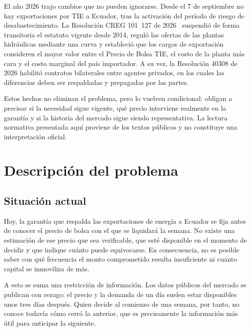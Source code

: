 \documentclass[11pt,letterpaper]{article}
\begin{document}
El año 2026 trajo cambios que no pueden ignorarse. Desde el 7 de
septiembre no hay exportaciones por TIE a Ecuador, tras la activación
del período de riesgo de desabastecimiento. La Resolución CREG 101~127
de 2026~\cite{creg2026} suspendió de forma transitoria el estatuto vigente desde 2014,
reguló las ofertas de las plantas hidráulicas mediante una curva y
estableció que los cargos de exportación consideren el mayor valor entre
el Precio de Bolsa TIE, el costo de la planta más cara y el costo
marginal del país importador. A su vez, la Resolución 40308 de 2026
habilitó contratos bilaterales entre agentes privados, en los cuales las
diferencias deben ser respaldadas y prepagadas por las partes.

Estos hechos no eliminan el problema, pero lo vuelven condicional:
obligan a precisar si la necesidad sigue vigente, qué precio interviene
realmente en la garantía y si la historia del mercado sigue siendo
representativa. La lectura normativa presentada aquí proviene de los
textos públicos y no constituye una interpretación oficial.

\section{Descripción del problema}
\label{sec:problema}

\subsection{Situación actual}

Hoy, la garantía que respalda las exportaciones de energía a Ecuador se
fija antes de conocer el precio de bolsa con el que se liquidará la
semana. No existe una estimación de ese precio que sea verificable, que
esté disponible en el momento de decidir y que indique cuánto puede
equivocarse. En consecuencia, no es posible saber con qué frecuencia el
monto comprometido resulta insuficiente ni cuánto capital se inmoviliza
de más.

A esto se suma una restricción de información. Los datos públicos del
mercado se publican con rezago: el precio y la demanda de un día suelen
estar disponibles unos tres días después. Quien decide al comienzo de
una semana, por tanto, no conoce todavía cómo cerró la anterior, que es
precisamente la información más útil para anticipar la siguiente.
\end{document}
